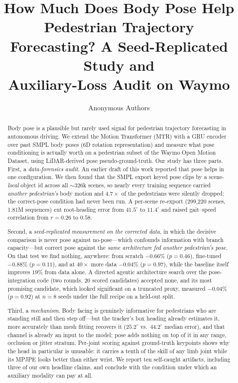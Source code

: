 \documentclass{article} %
\title{How Much Does Body Pose Help Pedestrian Trajectory\\Forecasting? A Seed-Replicated Study and\\Auxiliary-Loss Audit on Waymo}
\author{Anonymous Authors}
\begin{document}
\maketitle

\begin{abstract}
Body pose is a plausible but rarely used signal for pedestrian trajectory
forecasting in autonomous driving. We extend the Motion Transformer (MTR) with a
GRU encoder over past SMPL body poses (6D rotation representation) and measure
what pose conditioning is actually worth on a pedestrian subset of the Waymo Open
Motion Dataset, using LiDAR-derived pose pseudo-ground-truth.
Our study has three parts. First, a \emph{data-forensics audit}. An earlier draft
of this work reported that pose helps in one configuration. We then found that the
SMPL export keyed pose clips by a scene-\emph{local} object id across all
${\sim}326$k scenes, so nearly every training sequence carried \emph{another
pedestrian's} body motion and $4.7\times$ of the pedestrians were silently
dropped; the correct-pose condition had never been run. A per-scene re-export
(299{,}220 scenes, 1.81M sequences) cut root-heading error from $41.5^\circ$ to
$11.4^\circ$ and raised gait--speed correlation from $r{=}0.26$ to $0.58$.

Second, a \emph{seed-replicated measurement on the corrected data}, in which the
decisive comparison is never pose against no-pose---which confounds information
with branch capacity---but correct pose against the \emph{same architecture fed
another pedestrian's pose}. On that test we find nothing, anywhere: from scratch
$-0.66\%$ ($p{=}0.46$), fine-tuned $-0.88\%$ ($p{=}0.11$), and at $40\times$ more
data $-0.04\%$ ($p{=}0.97$), while the baseline itself improves $19\%$ from data
alone. A directed agentic architecture search over the pose-integration code (two
rounds, 20 scored candidates) accepted none, and its most promising candidate,
which looked significant on a truncated proxy, measured $-0.04\%$ ($p{=}0.92$) at
$n{=}8$ seeds under the full recipe on a held-out split.

Third, a \emph{mechanism}. Body facing is genuinely informative for pedestrians
who are standing still and then step off---but the tracker's box heading already
estimates it, more accurately than mesh fitting recovers it
($25.2^\circ$ vs.\ $44.2^\circ$ median error), and that channel is already an
input to the model; pose adds nothing on top of it in any range, occlusion or
jitter stratum. Per-joint scoring against ground-truth keypoints shows why the
head in particular is unusable: it carries a tenth of the skill of any limb joint
while its MPJPE looks better than either wrist. We report ten self-caught
artifacts, including three of our own headline claims, and conclude with the
condition under which an auxiliary modality can pay at all.
\end{abstract}
\end{document}
